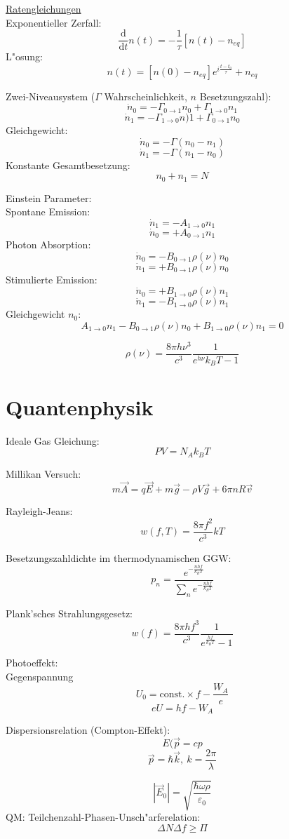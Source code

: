 \documentclass[12pt]{report}
\newcommand{\vepsilon}{\varepsilon}
\newcommand{\dd}{\mathrm{d}}
\begin{document}
\underline{Ratengleichungen}\\
Exponentieller Zerfall:
\[\frac{\dd}{\dd t}n(t)=-\frac{1}{\tau}[n(t)-n_{eq}]\]
L"osung:
\[n(t)=[n(0)-n_{eq}]e^{i\frac{t-t_0}{\tau}}+n_{eq}\]

Zwei-Niveausystem ($\Gamma$ Wahrscheinlichkeit, $n$ Besetzungszahl):
\[\dot{n}_0=-\Gamma_{0\to1}n_0+\Gamma_{1\to0}n_1\]
\[\dot{n}_1=-\Gamma_{1\to0}n)1+\Gamma_{0\to1}n_0\]
Gleichgewicht:
\[\dot{n}_0=-\Gamma(n_0-n_1)\]
\[\dot{n}_1=-\Gamma(n_1-n_0)\]
Konstante Gesamtbesetzung:
\[n_0+n_1=N\]

Einstein Parameter:\\
Spontane Emission:
\[\dot{n}_1=-A_{1\to0}n_1\]
\[\dot{n}_0=+A_{0\to1}n_1\]
Photon Absorption:
\[\dot{n}_0=-B_{0\to1}\rho(\nu)n_0\]
\[\dot{n}_1=+B_{0\to1}\rho(\nu)n_0\]
Stimulierte Emission:
\[\dot{n}_0=+B_{1\to0}\rho(\nu)n_1\]
\[\dot{n}_1=-B_{1\to0}\rho(\nu)n_1\]
Gleichgewicht $n_0$:
\[A_{1\to0}n_1-B_{0\to1}\rho(\nu)n_0+B_{1\to0}\rho(\nu)n_1=0\]

\[\rho(\nu)=\frac{8\pi h\nu^3}{c^3}\frac{1}{e^{h\nu}{k_BT}-1}\]

\section{Quantenphysik}

Ideale Gas Gleichung:
\[PV=N_Ak_BT\]

Millikan Versuch:
\[m\vec{A}=q\vec{E}+m\vec{g}-\rho V\vec{g}+6\pi nR\vec{v}\]

Rayleigh-Jeans:
\[w(f,T)=\frac{8\pi f^2}{c^3}kT\]

Besetzungszahldichte im thermodynamischen GGW:
\[p_n=\frac{e^{-\frac{nhf}{k_BT}}}{\sum_ne^{-\frac{nhf}{k_BT}}}\]

Plank'sches Strahlungsgesetz:
\[w(f)=\frac{8\pi hf^3}{c^3}\frac{1}{e^\frac{hf}{k_BT}-1}\]

Photoeffekt:\\
Gegenspannung
\[U_0=\mathrm{const.}\times f-\frac{W_A}{e}\]
\[eU=hf-W_A\]

Dispersionsrelation (Compton-Effekt):
\[E(\vec{p}=cp\]
\[\vec{p}=\hbar\vec{k},\ k=\frac{2\pi}{\lambda}\]

\[|\vec{E}_0|=\sqrt{\frac{\hbar\omega\rho}{\vepsilon_0}}\]
QM: Teilchenzahl-Phasen-Unsch"arferelation:
\[\Delta N\Delta f\geq\Pi\]

\end{document}
